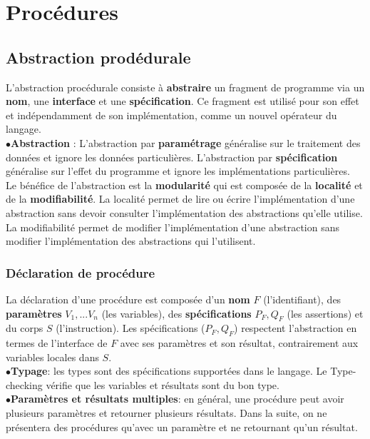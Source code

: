 \section{Procédures}
\subsection{Abstraction prodédurale}
L'abstraction procédurale consiste à \textbf{abstraire} un fragment de programme via un \textbf{nom}, une \textbf{interface} et une \textbf{spécification}. Ce fragment est utilisé pour son effet et indépendamment de son implémentation, comme un nouvel opérateur du langage.\\

$\bullet$\textbf{Abstraction} : L'abstraction par \textbf{paramétrage} généralise sur le traitement des données et ignore les données particulières. L'abstraction par \textbf{spécification} généralise sur l'effet du programme et ignore les implémentations particulières.\\
Le bénéfice de l'abstraction est la \textbf{modularité} qui est composée de la \textbf{localité} et de la \textbf{modifiabilité}. La localité permet de lire ou écrire l'implémentation d'une abstraction sans devoir consulter l'implémentation des abstractions qu'elle utilise. La modifiabilité permet de modifier l'implémentation d'une abstraction sans modifier l'implémentation des abstractions qui l'utilisent.
\subsubsection{Déclaration de procédure}
La déclaration d'une procédure est composée d'un \textbf{nom} $F$ (l'identifiant), des \textbf{paramètres} $V_1,...V_n$ (les variables), des \textbf{spécifications} $P_F,Q_F$ (les assertions) et du corps $S$ (l'instruction). Les spécifications ($P_F,Q_F$) respectent l'abstraction en termes de l'interface de $F$ avec ses paramètres et son résultat, contrairement aux variables locales dans $S$.\\

$\bullet$\textbf{Typage}: les types sont des spécifications supportées dans le langage. Le Type-checking vérifie que les variables et résultats sont du bon type.
\\

$\bullet$\textbf{Paramètres et résultats multiples}: en général, une procédure peut avoir plusieurs paramètres et retourner plusieurs résultats. Dans la suite, on ne présentera des procédures qu'avec un paramètre et ne retournant qu'un résultat. 
\\


